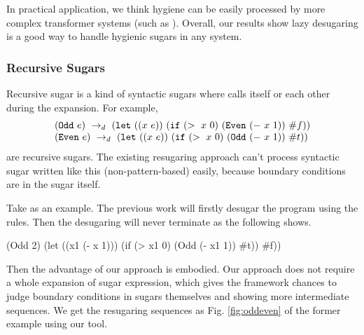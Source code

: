 In practical application, we think hygiene can be easily processed by more complex transformer systems (such as \cite{10.5555/1792878.1792884}). Overall, our results show lazy desugaring is a good way to handle hygienic sugars in any system.

\subsubsection{Recursive Sugars}
\label{sec:recursiveSugar}

Recursive sugar is a kind of syntactic sugars where calls itself or each other during the expansion. For example,
\[
\begin{array}{l}
(\mbox{\tt Odd}~e) ~\rightarrow_d~ (\mbox{\tt let}~((x~e))~(\mbox{\tt if}~(>~x~0)~(\mbox{\tt Even}~(-~x~1))~\#f))\\
(\mbox{\tt Even}~e) ~\rightarrow_d~ (\mbox{\tt let}~((x~e))~(\mbox{\tt if}~(>~x~0)~(\mbox{\tt Odd}~(-~x~1))~\#t))
\end{array}
\]
are recursive sugars. The existing resugaring approach can't process syntactic sugar written like this (non-pattern-based) easily, because boundary conditions are in the sugar itself.

Take  as an example. The previous work will firstly desugar the program using the rules. Then the desugaring will never terminate as the following shows.
\begin{footnotesize}
\begin{Codes}
   (Odd 2)
\qquad\quad(let ((x1 (- x 1))) (if (> x1 0) (Odd (- x1 1)) \#t))
\qquad\quad\#f))
\end{Codes}
\end{footnotesize}



Then the advantage of our approach is embodied. Our approach does not require a whole expansion of sugar expression, which gives the framework chances to judge boundary conditions in sugars themselves and showing more intermediate sequences. We get the resugaring sequences as Fig.  \ref{fig:oddeven} of the former example using our tool.



